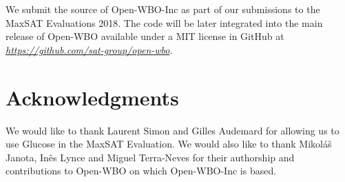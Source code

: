 \documentclass[conference]{IEEEtran}
\newcommand{\toolname}{\textsf{Open-WBO-Inc}\xspace}
\begin{document}
We submit the source of \toolname as part of our submissions to the MaxSAT Evaluations 2018. The code will be later integrated into the main release of \textsf{Open-WBO} available under a MIT license in GitHub at \emph{\url{https://github.com/sat-group/open-wbo}}.

\section*{Acknowledgments}

We would like to thank Laurent Simon and Gilles Audemard for
allowing us to use Glucose in the MaxSAT Evaluation. We
would also like to thank Mikol{\'a}{\v{s}} Janota,  In\^es Lynce and Miguel
Terra-Neves for their authorship and contributions to
\textsf{Open-WBO} on which \toolname is based.

\balance




\end{document}
